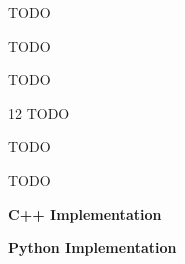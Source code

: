 
\label{prob:lc-136-single-number}

\ProblemSummary
TODO

\KeyIdea
TODO

\begin{Thinking}
TODO
\end{Thinking}

\Algorithm
\begin{CodeBlock}[style=pseudo,caption={Pseudocode}]{12}
TODO
\end{CodeBlock}

\Correctness
TODO

\Complexity
TODO

\bigskip
\noindent\textbf{C++ Implementation}



\bigskip
\noindent\textbf{Python Implementation}



\ProblemDivider
